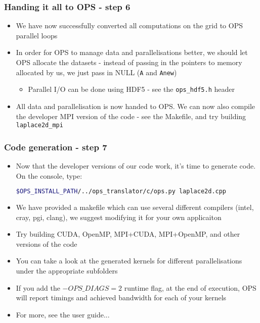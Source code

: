 \documentclass{beamer}
\begin{document}
\begin{frame}[fragile]
\frametitle{Handing it all to OPS - step 6}
\begin{itemize}
\item We have now successfully converted all computations on the grid to OPS parallel loops
\item In order for OPS to manage data and parallelisations better, we should let OPS allocate the datasets - instead of passing in the pointers to memory allocated by us, we just pass in NULL (\texttt{A} and \texttt{Anew})
\begin{itemize}
\item Parallel I/O can be done using HDF5 - see the \texttt{ops\_hdf5.h} header
\end{itemize}
\item All data and parallelisation is now handed to OPS. We can now also compile the developer MPI version of the code - see the Makefile, and try building \texttt{laplace2d\_mpi}
\end{itemize}
\end{frame}

\begin{frame}[fragile]
\frametitle{Code generation - step 7}
\begin{itemize}
\item Now that the developer versions of our code work, it's time to generate code. On the console, type:
\begin{lstlisting}[language=bash,basicstyle=\tiny]
$OPS_INSTALL_PATH/../ops_translator/c/ops.py laplace2d.cpp
\end{lstlisting}
\item We have provided a makefile which can use several different compilers (intel, cray, pgi, clang), we suggest modifying it for your own applicaiton
\item Try building CUDA, OpenMP, MPI+CUDA, MPI+OpenMP, and other versions of the code
\item You can take a look at the generated kernels for different parallelisations under the appropriate subfolders
\item If you add the $-OPS\_DIAGS=2$ runtime flag, at the end of execution, OPS will report timings and achieved bandwidth for each of your kernels
\item For more, see the user guide...
\end{itemize}
\end{frame}
\end{document}
